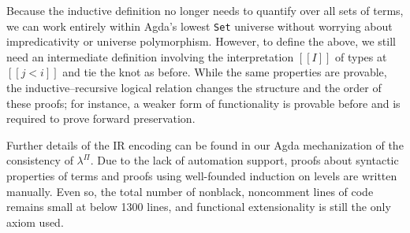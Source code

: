 \documentclass[\ifpublic nolinenum\else\fi,online,OA]{jfp}
\newcommand{\scw}[1]{}
\newcommand{\lang}{$\lambda^{\Pi}$\xspace}
\theoremstyle{definition}
\begin{document}
Because the inductive definition no longer needs to quantify over all sets of terms,
we can work entirely within Agda's lowest \texttt{Set} universe without worrying
about impredicativity or universe polymorphism. However, to define the above,
we still need an intermediate definition involving the interpretation $[[I]]$
of types at $[[j < i]]$ and tie the knot as before. While the same properties
are provable, the inductive--recursive logical relation changes the structure
and the order of these proofs; for instance, a weaker form of functionality
is provable before and is required to prove forward preservation.

Further details of the IR encoding can be found in our Agda mechanization of
the consistency of \lang. Due to the lack of automation support, proofs about
syntactic properties of terms and proofs using well-founded induction on levels
are written manually. Even so, the total number of nonblack, noncomment lines
of code remains small at below 1300 lines, and functional extensionality is
still the only axiom used.



\end{document}
